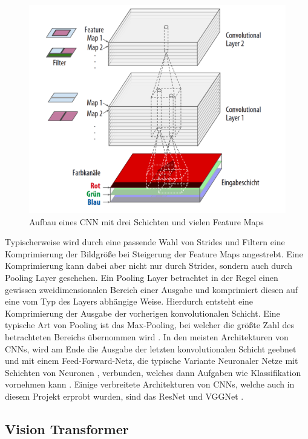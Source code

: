 \documentclass[twoside,a4paper]{IEEEtran}
\begin{document}
\begin{figure}[!htb]
	\includegraphics[width=\columnwidth]{cnn_example}
	\caption{Aufbau eines CNN mit drei Schichten und vielen Feature Maps \cite[S.365]{MACHINE_LEARNING}}
	\label{bild2}
\end{figure}

Typischerweise wird durch eine passende Wahl von Strides und Filtern eine Komprimierung der Bildgröße bei Steigerung der Feature Maps angestrebt. Eine Komprimierung kann dabei aber nicht nur durch Strides, sondern auch durch Pooling Layer geschehen. Ein Pooling Layer betrachtet in der Regel einen gewissen zweidimensionalen Bereich einer Ausgabe und komprimiert diesen auf eine vom Typ des Layers abhängige Weise. Hierdurch entsteht eine Komprimierung der Ausgabe der vorherigen konvolutionalen Schicht. Eine typische Art von Pooling ist das Max-Pooling, bei welcher die größte Zahl des betrachteten Bereichs übernommen wird \cite[S.369-370]{MACHINE_LEARNING}. In den meisten Architekturen von CNNs, wird am Ende die Ausgabe der letzten konvolutionalen Schicht geebnet und mit einem Feed-Forward-Netz, die typische Variante Neuronaler Netze mit Schichten von Neuronen \cite[S.263]{MACHINE_LEARNING}, verbunden, welches dann Aufgaben wie Klassifikation vornehmen kann \cite[S.371]{MACHINE_LEARNING}. Einige verbreitete Architekturen von CNNs, welche auch in diesem Projekt erprobt wurden, sind das ResNet und VGGNet \cite[S.378-381]{MACHINE_LEARNING}.

\subsection{Vision Transformer} %
\end{document}
